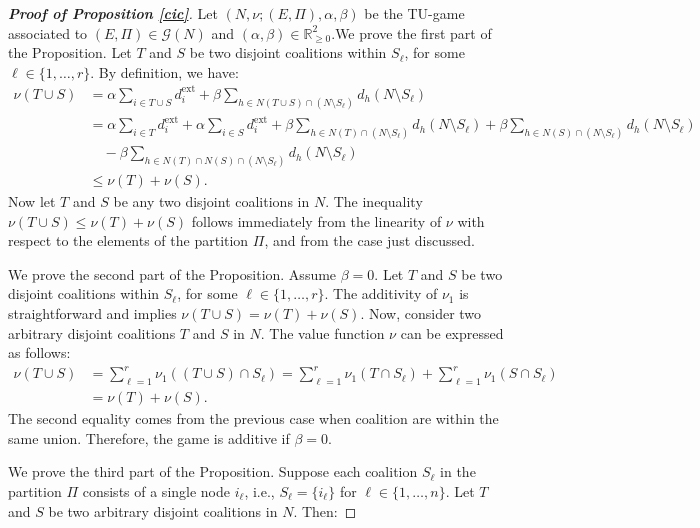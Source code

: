 \documentclass[preprint,11pt,authoryear]{elsarticle}
\theoremstyle{plain}
\begin{document}
\begin{proof}[\bf Proof of Proposition \ref{cic}]
	Let \( (N, \nu; (E, \Pi), \alpha, \beta) \) be the TU-game associated to $(E, \Pi)\in\mathcal{G}(N)$ and $(\alpha, \beta)\in\mathbb{R}_{\geq0}^2$.We prove the first part of the Proposition.
	Let \( T \) and \( S \) be two disjoint coalitions within \( S_\ell \), for some \( \ell \in \{1, \dots, r\} \). By definition, we have:
	\[
	\begin{aligned}\label{ineqa}
		\nu(T \cup S) &= \alpha \sum_{i \in T \cup S} d_i^{\text{ext}} + \beta \sum_{h \in N(T \cup S) \cap (N \setminus S_\ell)} d_h(N\setminus S_\ell)\\
		&= \alpha \sum_{i \in T} d_i^{\text{ext}} + \alpha \sum_{i \in S} d_i^{\text{ext}} 
		+ \beta \sum_{h \in N(T) \cap (N \setminus S_\ell)}d_h(N\setminus S_\ell) 
		+ \beta \sum_{h \in N(S) \cap (N \setminus S_\ell)}d_h(N\setminus S_\ell) \\
		&\quad - \beta \sum_{h \in N(T) \cap N(S) \cap (N \setminus S_\ell)}d_h(N\setminus S_\ell) \\
		&\leq \nu(T) + \nu(S).
	\end{aligned}
	\]
	Now let \( T \) and \( S \) be any two disjoint coalitions in \( N \). The inequality  
	$
	\nu(T \cup S) \leq \nu(T) + \nu(S)
	$
	follows immediately from the linearity of \( \nu \) with respect to the elements of the partition \( \Pi \), and from the case just discussed.
	
	We prove the second part of the Proposition. Assume \( \beta = 0 \). Let \( T \) and \( S \) be two disjoint coalitions within \( S_\ell \), for some \( \ell \in \{1, \dots, r\} \). The additivity of $\nu_1$ is straightforward and implies $\nu(T\cup S)=\nu(T)+\nu(S)$.
	Now, consider two arbitrary disjoint coalitions \( T \) and \( S \) in \( N \). The value function \( \nu \) can be expressed as follows:
	\[
	\begin{aligned}
		\nu(T \cup S) &= \sum_{\ell=1}^r \nu_{1}\left((T \cup S) \cap S_\ell\right) = \sum_{\ell=1}^r \nu_{1}\left(T \cap S_\ell\right) + \sum_{\ell=1}^r \nu_1\left(S \cap S_\ell\right) \\
		&= \nu(T) + \nu(S).
	\end{aligned}
	\]
	The second equality comes from the previous case when coalition are within the same union.
	Therefore, the game is additive if \( \beta = 0 \).
	
	
	We prove the third part of the Proposition. 
	Suppose each coalition \( S_\ell \) in the partition \( \Pi \) consists of a single node \( i_\ell \), i.e., \( S_\ell = \{i_\ell\} \) for \( \ell \in \{1, \dots, n\} \). Let \( T \) and \( S \) be two arbitrary disjoint coalitions in \( N \). Then:
	

\end{proof}
\end{document}
